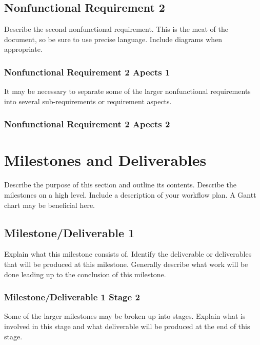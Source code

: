 \documentclass{article}
\begin{document}
\subsection{Nonfunctional Requirement 2}
Describe the second nonfunctional requirement. This is the meat of the document, so be sure to use precise language. Include diagrams when appropriate.

\subsubsection{Nonfunctional Requirement 2 Apects 1}
It may be necessary to separate some of the larger nonfunctional requirements into several sub-requirements or requirement aspects.

\subsubsection{Nonfunctional Requirement 2 Apects 2}

\section{Milestones and Deliverables}
Describe the purpose of this section and outline its contents. Describe the milestones on a high level. Include a description of your workflow plan. A Gantt chart may be beneficial here.

\subsection{Milestone/Deliverable 1}
Explain what this milestone consists of. Identify the deliverable or deliverables that will be produced at this milestone. Generally describe what work will be done leading up to the conclusion of this milestone.

\subsubsection{Milestone/Deliverable 1 Stage 2}
Some of the larger milestones may be broken up into stages. Explain what is involved in this stage and what deliverable will be produced at the end of this stage.
\end{document}
